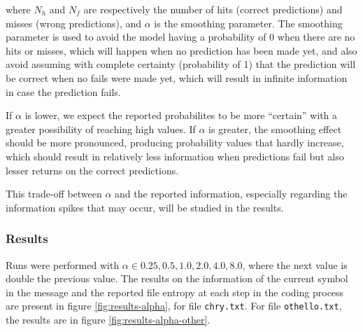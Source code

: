 \documentclass{article}
\begin{document}
where $N_h$ and $N_f$ are respectively the number of hits (correct predictions) and misses (wrong predictions), and $\alpha$ is the smoothing parameter.
The smoothing parameter is used to avoid the model having a probability of 0 when there are no hits or misses, which will happen when no prediction has been made yet, and also avoid assuming with complete certainty (probability of 1) that the prediction will be correct when no fails were made yet, which will result in infinite information in case the prediction fails.

If $\alpha$ is lower, we expect the reported probabilites to be more ``certain'' with a greater possibility of reaching high values.
If $\alpha$ is greater, the smoothing effect should be more pronounced, producing probability values that hardly increase, which should result in relatively less information when predictions fail but also lesser returns on the correct predictions.

This trade-off between $\alpha$ and the reported information, especially regarding the information spikes that may occur, will be studied in the results.

\subsubsection{Results}

Runs were performed with $\alpha \in {0.25, 0.5, 1.0, 2.0, 4.0, 8.0}$, where the next value is double the previous value.
The results on the information of the current symbol in the message and the reported file entropy at each step in the coding process are
present in figure \ref{fig:results-alpha}, for file \verb|chry.txt|.
For file \verb|othello.txt|, the results are in figure \ref{fig:results-alpha-other}.
\end{document}
